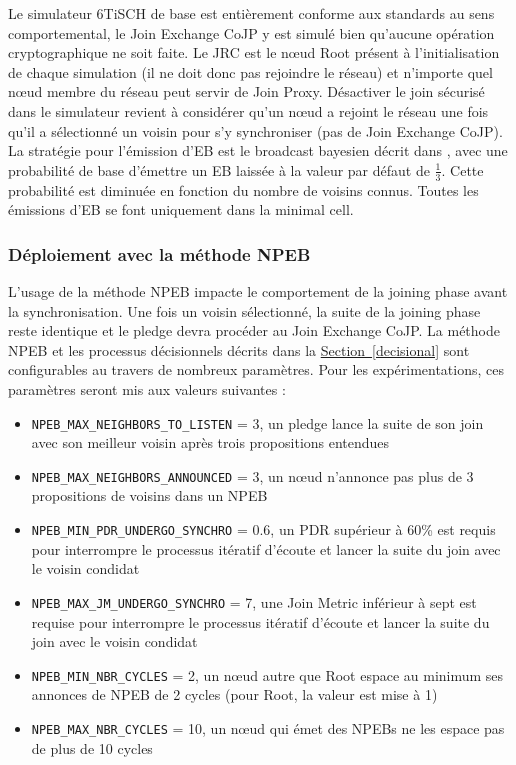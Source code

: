 \documentclass[]{report}
\newcommand{\wordlink}[2]{\hyperref[#2]{#1~\ref{#2}}}
\begin{document}
Le simulateur 6TiSCH de base est entièrement conforme aux standards au sens comportemental, le Join Exchange CoJP y est simulé bien qu'aucune opération cryptographique ne soit faite. Le JRC est le nœud Root présent à l'initialisation de chaque simulation (il ne doit donc pas rejoindre le réseau) et n'importe quel nœud membre du réseau peut servir de Join Proxy. Désactiver le join sécurisé dans le simulateur revient à considérer qu'un nœud a rejoint le réseau une fois qu'il a sélectionné un voisin pour s'y synchroniser (pas de Join Exchange CoJP).\\

La stratégie pour l'émission d'EB est le broadcast bayesien décrit dans \cite{broadcast-strategies}, avec une probabilité de base d'émettre un EB laissée à la valeur par défaut de $\frac{1}{3}$. Cette probabilité est diminuée en fonction du nombre de voisins connus. Toutes les émissions d'EB se font uniquement dans la minimal cell. 

\subsubsection{Déploiement avec la méthode NPEB}

L'usage de la méthode NPEB impacte le comportement de la joining phase avant la synchronisation. Une fois un voisin sélectionné, la suite de la joining phase reste identique et le pledge devra procéder au Join Exchange CoJP. La méthode NPEB et les processus décisionnels décrits dans la \wordlink{Section}{decisional} sont configurables au travers de nombreux paramètres. Pour les expérimentations, ces paramètres seront mis aux valeurs suivantes :

\begin{itemize}[label=$\bullet$]
\item \texttt{NPEB\_MAX\_NEIGHBORS\_TO\_LISTEN} = 3, un pledge lance la suite de son join avec son meilleur voisin après trois propositions entendues
\vspace{0.1cm}
\item \texttt{NPEB\_MAX\_NEIGHBORS\_ANNOUNCED} = 3, un nœud n'annonce pas plus de 3 propositions de voisins dans un NPEB
\vspace{0.1cm}
\item \texttt{NPEB\_MIN\_PDR\_UNDERGO\_SYNCHRO} = 0.6, un PDR supérieur à 60\% est requis pour interrompre le processus itératif d'écoute et lancer la suite du join avec le voisin condidat
\vspace{0.1cm}
\item \texttt{NPEB\_MAX\_JM\_UNDERGO\_SYNCHRO} = 7, une Join Metric inférieur à sept est requise pour interrompre le processus itératif d'écoute et lancer la suite du join avec le voisin condidat 
\vspace{0.1cm}
\item \texttt{NPEB\_MIN\_NBR\_CYCLES} = 2, un nœud autre que Root espace au minimum ses annonces de NPEB de 2 cycles (pour Root, la valeur est mise à 1)
\vspace{0.1cm}
\item \texttt{NPEB\_MAX\_NBR\_CYCLES} = 10, un nœud qui émet des NPEBs ne les espace pas de plus de 10 cycles
\end{itemize}
\end{document}
